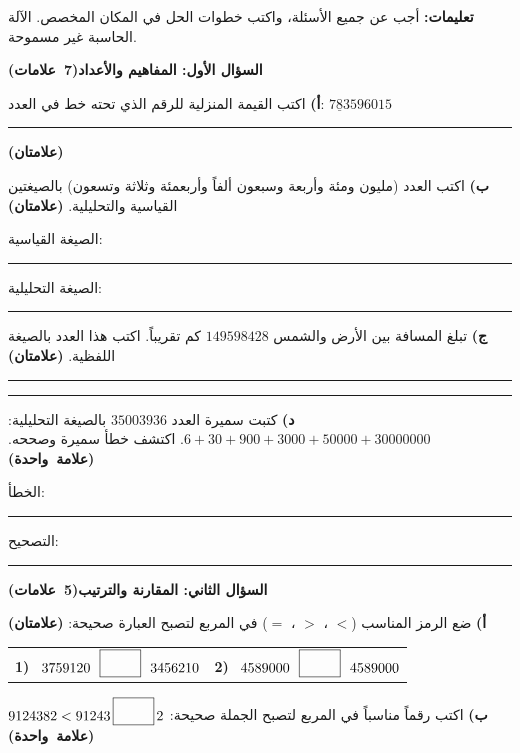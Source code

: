 \documentclass[12pt, a4paper]{article}
\newcommand{\question}[2]{%
  \par\vspace{0.2cm}\noindent
  \colorbox{gray!15}{\parbox{\dimexpr\linewidth-2\fboxsep\relax}{\textbf{\large #1}\hfill\mbox{\textbf{(#2)}}}}%
  \par\vspace{0.12cm}}
\newcommand{\pts}[1]{\hfill\mbox{\textbf{(#1)}}}
\newcommand{\blank}[1][5cm]{\rule{#1}{0.4pt}}
\newcommand{\sqbox}{\fbox{\rule{0pt}{0.45cm}\hspace{0.8cm}}}
\begin{document}
\vspace{-0.15cm}
\noindent\textbf{تعليمات:} أجب عن جميع الأسئلة، واكتب خطوات الحل في المكان المخصص. الآلة الحاسبة غير مسموحة.

\question{السؤال الأول: المفاهيم والأعداد}{7 علامات}

\textbf{أ)} اكتب القيمة المنزلية للرقم الذي تحته خط في العدد: \quad $7\underline{8}3596015$
\quad \blank[4.5cm] \pts{علامتان}
\vspace{0.3cm}

\textbf{ب)} اكتب العدد (مليون ومئة وأربعة وسبعون ألفاً وأربعمئة وثلاثة وتسعون) بالصيغتين القياسية والتحليلية. \pts{علامتان}
\par\vspace{0.35cm}
الصيغة القياسية: \blank[4cm] \par\vspace{0.4cm}
الصيغة التحليلية: \blank[13cm]
\vspace{0.3cm}

\textbf{ج)} تبلغ المسافة بين الأرض والشمس $149598428$ كم تقريباً. اكتب هذا العدد بالصيغة اللفظية. \pts{علامتان}
\par\vspace{0.6cm}
\rule{\linewidth}{0.4pt}
\par\vspace{0.6cm}
\rule{\linewidth}{0.4pt}
\vspace{0.3cm}

\textbf{د)} كتبت سميرة العدد $35003936$ بالصيغة التحليلية:\quad $6 + 30 + 900 + 3000 + 50000 + 30000000$.
اكتشف خطأ سميرة وصححه. \pts{علامة واحدة}
\par\vspace{0.5cm}
الخطأ: \blank[6cm] \hfill التصحيح: \blank[7cm]

\question{السؤال الثاني: المقارنة والترتيب}{5 علامات}

\textbf{أ)} ضع الرمز المناسب ($<$ ، $>$ ، $=$) في المربع لتصبح العبارة صحيحة: \pts{علامتان}
\par\vspace{0.15cm}
\begin{tabularx}{\linewidth}{XX}
\textbf{1)} \ $3759120 \ \ \sqbox \ \ 3456210$ & \textbf{2)} \ $4589000 \ \ \sqbox \ \ 4589000$
\end{tabularx}
\vspace{0.2cm}

\textbf{ب)} اكتب رقماً مناسباً في المربع لتصبح الجملة صحيحة: \quad
$9124382 < 91243\,\sqbox\,2$ \pts{علامة واحدة}
\vspace{0.3cm}
\end{document}
